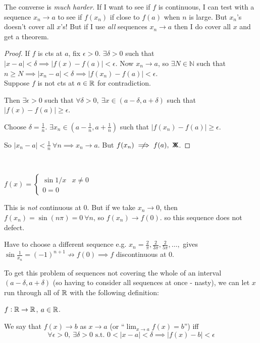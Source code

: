 The converse is \emph{much harder}. If I want to see if $f$ is continuous, I can test with a sequence $x_n \to a$ to see if $f(x_n)$ if close to $f(a)$ when $n$ is large. But $x_n$'s doesn't cover all $x$'s! But if I use \emph{all} sequences $x_n \to a$ then I do cover all $x$ and get a theorem. 

\begin{proof}
If $f$ is cts at $a$, fix $\epsilon >0$. $\exists \delta > 0$ such that $|x-a| < \delta \implies |f(x) - f(a)| < \epsilon$. Now $x_n \to a$, so $\exists N \in \mathbb{N}$ such that $n \geq N \implies |x_n - a| < \delta \implies |f(x_n) - f(a)| < \epsilon$.\\

\noindent Suppose $f$ is not cts at $a\in \mathbb{R}$ for contradiction.

 Then $\exists \epsilon >0$ such that $\forall \delta >0,~\exists x \in (a-\delta,a+\delta)$ such that $|f(x) -f(a)| \geq \epsilon.$ 
 
 Choose $\delta = \frac{1}{n}$. $\exists x_n \in (a - \frac{1}{n},a + \frac{1}{n})$ such that $|f(x_n) - f(a)| \geq \epsilon$. 
 
 So $|x_n-a| < \frac{1}{n}~\forall n \implies x_n \to a$. But $f(x_n) \centernot\implies f(a),~\cont$.  
\end{proof}~

\begin{example}
$f(x) =\begin{cases}
\sin 1/x & x \neq 0\\
0 = 0
\end{cases}
$	

This is \emph{not} continuous at $0$. But if we take $x_n \to 0$, then $f(x_n) = \sin(n\pi) = 0~\forall n$, so $f(x_n)\to f(0)$. so this sequence does not defect. 

Have to choose a different sequence e.g. $x_n = \frac{2}{\pi},\frac{2}{3\pi},\frac{2}{5\pi},\dots,$ gives $\sin\frac{1}{x_n} = (-1)^{n+1} \not\to f(0) \implies f$ discontinuous at $0$.  
\end{example}

To get this problem of sequences not covering the whole of an interval $(a-\delta, a+\delta)$ (so having to consider all sequences at once - nasty), we can let $x$ run through all of $\mathbb{R}$ with the following definition:\\

\begin{definition}
$f: \mathbb{R}\to \mathbb{R}$, $a\in\mathbb{R}$. 

We say that $f(x) \to b$ as $x \to a$ (or ``$\lim_{x\to a} f(x) = b$'') iff 
\[\forall \epsilon >0,~\exists \delta > 0 \text{ s.t. } 0 < |x-a| < \delta \implies |f(x) - b| < \epsilon\]	
\end{definition}

